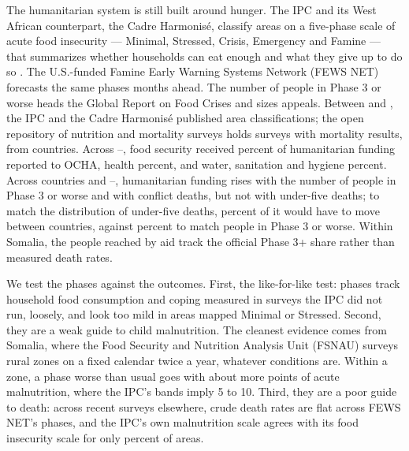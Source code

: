 \documentclass[11pt]{article}
\begin{document}
The humanitarian system is still built around hunger. The IPC and its West African counterpart, the Cadre Harmonis\'e, classify areas on a five-phase scale of acute food insecurity --- Minimal, Stressed, Crisis, Emergency and Famine --- that summarizes whether households can eat enough and what they give up to do so \citep{IPC2021manual}. The U.S.-funded Famine Early Warning Systems Network (FEWS NET) forecasts the same phases months ahead. The number of people in Phase 3 or worse heads the Global Report on Food Crises \citep{GRFC2026} and sizes appeals. Between \sysYearZero{} and \sysYearOne{}, the IPC and the Cadre Harmonis\'e published \sysClass{} area classifications; the open repository of nutrition and mortality surveys holds \sysMort{} surveys with mortality results, from \sysMortCountries{} countries. Across \ftsYearZero{}--\ftsYearOne{}, food security received \ftsFood{} percent of humanitarian funding reported to OCHA, health \ftsHealth{} percent, and water, sanitation and hygiene \ftsWash{} percent. Across \xcCountries{} countries and \xcYearZero{}--\xcYearOne{}, humanitarian funding rises with the number of people in Phase 3 or worse and with conflict deaths, but not with under-five deaths; to match the distribution of under-five deaths, \xcDisUfive{} percent of it would have to move between countries, against \xcDisPthree{} percent to match people in Phase 3 or worse. Within Somalia, the people reached by aid track the official Phase 3+ share rather than measured death rates.

We test the phases against the outcomes. First, the like-for-like test: phases track household food consumption and coping measured in surveys the IPC did not run, loosely, and look too mild in areas mapped Minimal or Stressed. Second, they are a weak guide to child malnutrition. The cleanest evidence comes from Somalia, where the Food Security and Nutrition Analysis Unit (FSNAU) surveys rural zones on a fixed calendar twice a year, whatever conditions are. Within a zone, a phase worse than usual goes with about \wzGamZone{} more points of acute malnutrition, where the IPC's bands imply 5 to 10. Third, they are a poor guide to death: across \spN{} recent surveys elsewhere, crude death rates are flat across FEWS NET's phases, and the IPC's own malnutrition scale agrees with its food insecurity scale for only \amnAnyDiag{} percent of areas.
\end{document}
